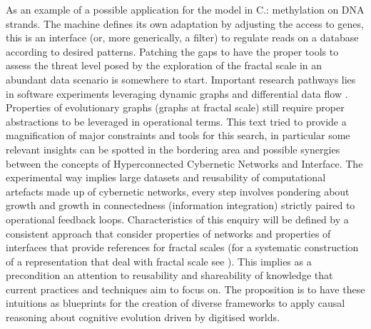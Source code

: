 \documentclass[14pt]{extarticle}
\begin{document}
As an example of a possible application for the model in C.: methylation on DNA strands. The machine defines its own adaptation by adjusting the access to genes, this is an interface (or, more generically, a filter) to regulate reads on a database according to desired patterns.
\newline
Patching the gaps to have the proper tools to assess the threat level posed by the exploration of the fractal scale in an abundant data scenario is somewhere to start. Important research pathways lies in software experiments leveraging dynamic graphs \cite{CS166dyngraphs} and differential data flow \cite{ABADIdiffdataflow}. Properties of evolutionary graphs (graphs at fractal scale) still require proper abstractions to be leveraged in operational terms. This text tried to provide a magnification of major constraints and tools for this search, in particular some relevant insights can be spotted in the bordering area and possible synergies between the concepts of Hyperconnected Cybernetic Networks and Interface. The experimental way implies large datasets and reusability of computational artefacts made up of cybernetic networks, every step involves pondering about growth and growth in connectedness (information integration) strictly paired to operational feedback loops. Characteristics of this enquiry will be defined by a consistent approach that consider properties of networks and properties of interfaces that provide references for fractal scales (for a systematic construction of a representation that deal with fractal scale see \cite{Wolfram2020}). This implies as a precondition an attention to reusability and shareability of knowledge that current practices and techniques aim to focus on. The proposition is to have these intuitions as blueprints for the creation of diverse frameworks to apply causal reasoning about cognitive evolution driven by digitised worlds.

\newpage

\end{document}
